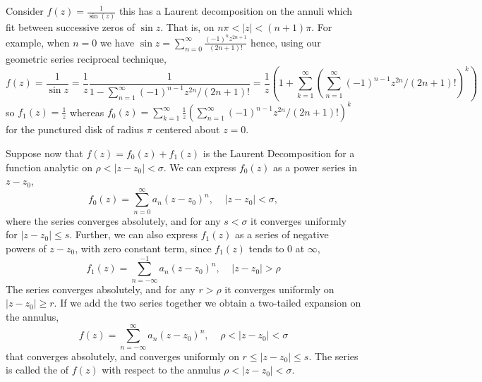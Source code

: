 \documentclass[12pt, a4paper, oneside, openright, titlepage]{book}
\begin{document}
\begin{eg}
    Consider $f(z) = \frac{1}{\sin(z)}$ this has a Laurent decomposition on the annuli which fit between successive zeros of $\sin z$. That is, on $n\pi < |z| < (n+1)\pi$. For example, when $n = 0$ we have $\sin z = \sum_{n=0}^{\infty}\frac{(-1)^nz^{2n+1}}{(2n+1)!}$ hence, using our geometric series reciprocal technique, \begin{equation*}
        f(z) = \frac{1}{\sin z} = \frac{1}{z}\frac{1}{1-\sum_{n=1}^{\infty}(-1)^{n-1}z^{2n}/(2n+1)!} = \frac{1}{z}\left(1+\sum_{k=1}^{\infty}\left(\sum_{n=1}^{\infty}(-1)^{n-1}z^{2n}/(2n+1)!\right)^k\right)
    \end{equation*}
    so $f_1(z) = \frac{1}{z}$ whereas $f_0(z) = \sum_{k=1}^{\infty}\frac{1}{z}\left(\sum_{n=1}^{\infty}(-1)^{n-1}z^{2n}/(2n+1)!\right)^k$ for the punctured disk of radius $\pi$ centered about $z = 0$.
\end{eg}

Suppose now that $f(z) = f_0(z)+f_1(z)$ is the Laurent Decomposition for a function analytic on $\rho < |z-z_0| < \sigma$. We can express $f_0(z)$ as a power series in $z-z_0$, \begin{equation*}
    f_0(z) = \sum_{n=0}^{\infty}a_n(z-z_0)^n,\;\;\;\;|z-z_0| < \sigma,
\end{equation*}
where the series converges absolutely, and for any $s < \sigma$ it converges uniformly for $|z-z_0| \leq s$. Further, we can also express $f_1(z)$ as a series of negative powers of $z-z_0$, with zero constant term, since $f_1(z)$ tends to $0$ at $\infty$, \begin{equation*}
    f_1(z) = \sum_{n=-\infty}^{-1}a_n(z-z_0)^n,\;\;\;\;|z-z_0| > \rho
\end{equation*}
The series converges absolutely, and for any $r > \rho$ it converges uniformly on $|z-z_0| \geq r$. If we add the two series together we obtain a two-tailed expansion on the annulus, \begin{equation*}
    f(z) = \sum_{n=-\infty}^{\infty}a_n(z-z_0)^n,\;\;\;\;\rho < |z-z_0| < \sigma
\end{equation*}
that converges absolutely, and converges uniformly on $r \leq |z-z_0| \leq s$. The series is called the  of $f(z)$ with respect to the annulus $\rho < |z-z_0| < \sigma$. 
\end{document}
